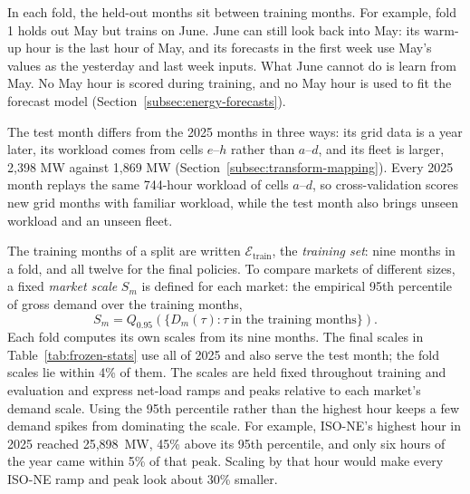 \documentclass{UNCC-thesis}
\begin{document}
In each fold, the held-out months sit between training months. For example,
fold 1 holds out May but trains on June. June can still look back into May:
its warm-up hour is the last hour of May, and its forecasts in the first week
use May's values as the yesterday and last week inputs.  What June cannot do is learn
from May. No May hour is scored during training, and no May hour is used to
fit the forecast model (Section~\ref{subsec:energy-forecasts}).

The test month differs from the 2025 months in three ways: its grid
data is a year later, its workload comes from cells \(e\)--\(h\) rather than
\(a\)--\(d\), and its fleet is larger, 2,398 MW against 1,869 MW
(Section~\ref{subsec:transform-mapping}). Every 2025 month replays the
same 744-hour workload of cells \(a\)--\(d\), so cross-validation scores new
grid months with familiar workload, while the test month also brings unseen
workload and an unseen fleet.

The training months of a split are written \(\mathcal E_{\mathrm{train}}\),
the \emph{training set}: nine months in a fold, and all twelve for the final
policies. To compare markets of different sizes, a fixed \emph{market scale}
\(S_m\) is defined for each market: the empirical 95th percentile of gross
demand over the training months,
\begin{equation}
  S_m
  =
  Q_{0.95}\!\left(\{D_m(\tau):\tau\ \text{in the training months}\}\right).
  \label{eq:market-scale}
\end{equation}
Each fold
computes its own scales from its nine months. The final scales in
Table~\ref{tab:frozen-stats} use all of 2025 and also serve the test month;
the fold scales lie within 4\% of them. The scales are held fixed throughout
training and evaluation and express net-load ramps and peaks relative to each
market's demand scale.
Using the 95th percentile rather than the highest hour keeps a few demand
spikes from dominating the scale. For example, ISO-NE's highest hour in 2025
reached 25,898~MW, 45\% above its 95th percentile, and only six hours of the
year came within 5\% of that peak. Scaling by that hour would make every
ISO-NE ramp and peak look about 30\% smaller.
\end{document}
